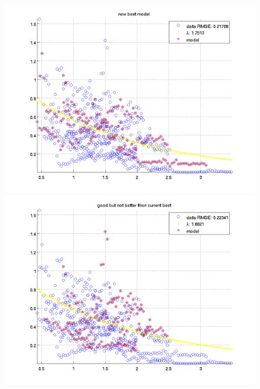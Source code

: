 \documentclass[12pt]{report}
\begin{document}
\newcommand{\imFeatRan}{0.45}
\begin{figure}[H]
\begin{minipage}[t]{0.5\linewidth}
	\centering
	\includegraphics[scale=\imFeatRan]{images/ransac1}\\
	\includegraphics[scale=\imFeatRan]{images/ransac3}\\
\end{minipage}
\begin{minipage}[t]{0.5\linewidth}
	\centering

\end{minipage}
\end{figure}
\end{document}
